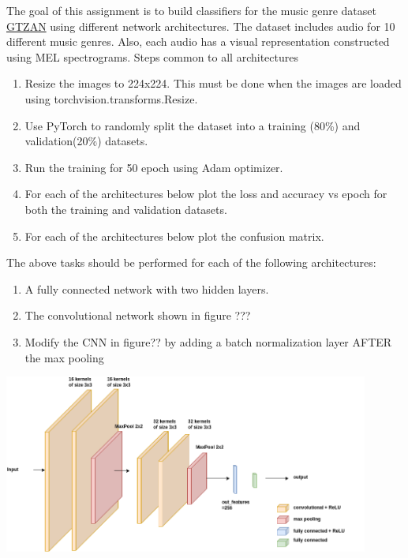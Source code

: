 \documentclass{article}
\begin{document}
The goal of this assignment is to build classifiers for the music genre dataset \href{https://www.kaggle.com/datasets/andradaolteanu/gtzan-dataset-music-genre-classification}{GTZAN} using different network architectures.
The dataset includes audio for 10 different music genres. Also, each audio has a visual representation constructed using MEL spectrograms.
Steps common to all architectures
\begin{enumerate}
    \item Resize the images to 224x224. This must be done when the images are loaded using torchvision.transforms.Resize. 
    \item Use PyTorch to randomly split the dataset into a training (80\%) and validation(20\%) datasets.
    \item Run the training for 50 epoch using Adam optimizer.
    \item For each of the architectures below plot the loss and accuracy vs epoch for both the training and validation datasets.
    \item For each of the architectures below plot the confusion matrix.
\end{enumerate}
The above tasks should be performed for each of the following architectures:
\begin{enumerate}
    \item A fully connected network with two hidden layers.
    \item The convolutional network shown in figure ???
    \item Modify the CNN in figure?? by adding a batch normalization layer AFTER the max pooling
    
\end{enumerate} 
\begin{center}
    \includegraphics[width=0.9\textwidth]{course-work-conv.png}
\end{center}
\end{document}

